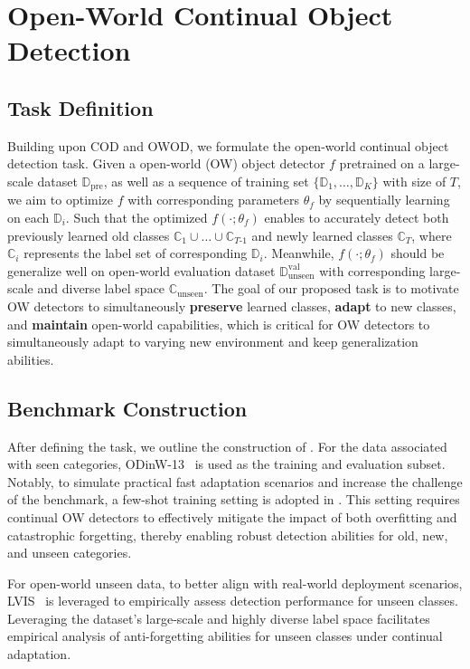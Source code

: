 \section{Open-World Continual Object Detection}\label{sec:data}
\subsection{Task Definition}\label{sec:data_task}
Building upon COD and OWOD, we formulate the open-world continual object detection task. 
%
Given a open-world (OW) object detector $f$ pretrained on a large-scale dataset $\mathbb{D}_{\text{pre}}$, as well as a sequence of training set $\{\mathbb{D}_{1}, \dots, \mathbb{D}_{K}\}$ with size of $T$, 
%
we aim to optimize $f$ with corresponding parameters $\theta_{f}$ by sequentially learning on each $\mathbb{D}_{i}$. 
%
Such that the optimized $f(\cdot;\theta_{f})$ enables to accurately detect both previously learned old classes $\mathbb{C}_{1}\cup \dots \cup\mathbb{C}_{T\text{-}1}$ and newly learned classes $\mathbb{C}_{T}$, where $\mathbb{C}_{i}$ represents the label set of corresponding $\mathbb{D}_{i}$.
%
Meanwhile, $f(\cdot;\theta_{f})$ should be generalize well on open-world evaluation dataset $\mathbb{D}^{\text{val}}_{\text{unseen}}$ with corresponding large-scale and diverse label space $\mathbb{C}_{\text{unseen}}$.
%
The goal of our proposed task is to motivate OW detectors to simultaneously {\textbf{preserve} learned classes, \textbf{adapt} to new classes, and \textbf{maintain} open-world capabilities}, which is critical for OW detectors to simultaneously adapt to varying new environment and keep generalization abilities.

\subsection{Benchmark Construction}\label{sec:data_construct}

After defining the task, we outline the construction of {\dataset}. 
 For the data associated with seen categories, ODinW-13~\cite{li2021grounded} is used as the training and evaluation subset. Notably, to simulate practical fast adaptation scenarios and increase the challenge of the benchmark, a few-shot training setting is adopted in {\dataset}. This setting requires continual OW detectors to effectively mitigate the impact of both overfitting and catastrophic forgetting, thereby enabling robust detection abilities for old, new, and unseen categories.

For open-world unseen data, to better align with real-world deployment scenarios, LVIS~\cite{gupta2019lvis} is leveraged to empirically assess detection performance for unseen classes. Leveraging the dataset's large-scale and highly diverse label space facilitates empirical analysis of anti-forgetting abilities for unseen classes under continual adaptation.

